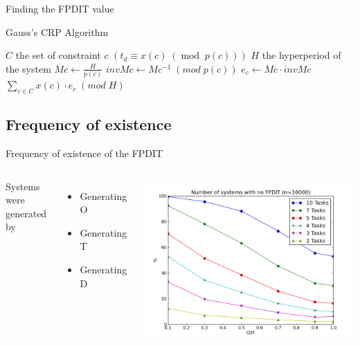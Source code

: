 \documentclass{beamer}
\begin{document}
    \begin{frame}{Finding the FPDIT value}

        \begin{algorithm}[H]
            \caption{Gauss's CRP Algorithm}
            \label{alg:algoCRP}
            \begin{algorithmic}[1]
                \REQUIRE $C$ the set of constraint $c$  $\left( t_d \equiv x(c) \; (\operatorname{mod} \; p(c)) \right)$
                \REQUIRE $H$ the hyperperiod of the system
                    \STATE $Mc \leftarrow \frac{H}{p(c)}$
                    \STATE $invMc \leftarrow Mc^{-1} \; (mod \; p(c))$
                    \STATE $e_c \leftarrow Mc \cdot invMc$
                \ENDFOR
                \RETURN $\sum\limits_{c \in C}{x(c) \cdot e_c} \; (mod \; H)$
            \end{algorithmic}
        \end{algorithm}

    \end{frame}

    \subsection{Frequency of existence}

    \begin{frame}{Frequency of existence of the FPDIT}

    \begin{columns}[c]

        Systems were generated by
        \begin{itemize}
            \item Generating O
            \item Generating T
            \item Generating D
        \end{itemize}

        \includegraphics[width=\textwidth]{figs/nofpdit_4.png}

    \end{columns}

    \end{frame}
\end{document}
